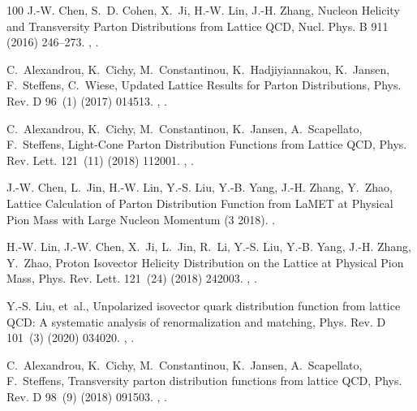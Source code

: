 \begin{thebibliography}{100}
J.-W. Chen, S.~D. Cohen, X.~Ji, H.-W. Lin, J.-H. Zhang, {Nucleon Helicity and
  Transversity Parton Distributions from Lattice QCD}, Nucl. Phys. B 911 (2016)
  246--273.
\newblock \href {http://arxiv.org/abs/1603.06664} {},
  \href {https://doi.org/10.1016/j.nuclphysb.2016.07.033}
  {}.

C.~Alexandrou, K.~Cichy, M.~Constantinou, K.~Hadjiyiannakou, K.~Jansen,
  F.~Steffens, C.~Wiese, {Updated Lattice Results for Parton Distributions},
  Phys. Rev. D 96~(1) (2017) 014513.
\newblock \href {http://arxiv.org/abs/1610.03689} {},
  \href {https://doi.org/10.1103/PhysRevD.96.014513}
  {}.

C.~Alexandrou, K.~Cichy, M.~Constantinou, K.~Jansen, A.~Scapellato,
  F.~Steffens, {Light-Cone Parton Distribution Functions from Lattice QCD},
  Phys. Rev. Lett. 121~(11) (2018) 112001.
\newblock \href {http://arxiv.org/abs/1803.02685} {},
  \href {https://doi.org/10.1103/PhysRevLett.121.112001}
  {}.

J.-W. Chen, L.~Jin, H.-W. Lin, Y.-S. Liu, Y.-B. Yang, J.-H. Zhang, Y.~Zhao,
  {Lattice Calculation of Parton Distribution Function from LaMET at Physical
  Pion Mass with Large Nucleon Momentum} (3 2018).
\newblock \href {http://arxiv.org/abs/1803.04393} {}.

H.-W. Lin, J.-W. Chen, X.~Ji, L.~Jin, R.~Li, Y.-S. Liu, Y.-B. Yang, J.-H.
  Zhang, Y.~Zhao, {Proton Isovector Helicity Distribution on the Lattice at
  Physical Pion Mass}, Phys. Rev. Lett. 121~(24) (2018) 242003.
\newblock \href {http://arxiv.org/abs/1807.07431} {},
  \href {https://doi.org/10.1103/PhysRevLett.121.242003}
  {}.

Y.-S. Liu, et~al., {Unpolarized isovector quark distribution function from
  lattice QCD: A systematic analysis of renormalization and matching}, Phys.
  Rev. D 101~(3) (2020) 034020.
\newblock \href {http://arxiv.org/abs/1807.06566} {},
  \href {https://doi.org/10.1103/PhysRevD.101.034020}
  {}.

C.~Alexandrou, K.~Cichy, M.~Constantinou, K.~Jansen, A.~Scapellato,
  F.~Steffens, {Transversity parton distribution functions from lattice QCD},
  Phys. Rev. D 98~(9) (2018) 091503.
\newblock \href {http://arxiv.org/abs/1807.00232} {},
  \href {https://doi.org/10.1103/PhysRevD.98.091503}
  {}.


\end{thebibliography}
